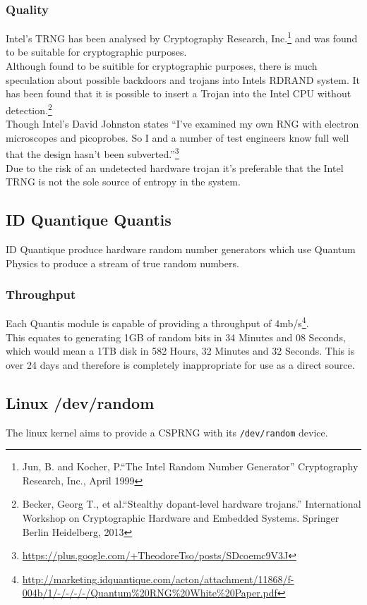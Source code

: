 \documentclass{paper}
\begin{document}
			\subsubsection{Quality}
				Intel's TRNG has been analysed by Cryptography Research, Inc.\footnote{Jun, B. and Kocher, P.``The Intel Random Number Generator'' Cryptography Research, Inc., April 1999} and was found to be suitable for cryptographic purposes.\\
				Although found to be suitible for cryptographic purposes, there is much speculation about possible backdoors and trojans into Intels RDRAND system. It has been found that it is possible to insert a Trojan into the Intel CPU without detection.\footnote{Becker, Georg T., et al.``Stealthy dopant-level hardware trojans.'' International Workshop on Cryptographic Hardware and Embedded Systems. Springer Berlin Heidelberg, 2013}\\
				Though Intel's David Johnston states ``I’ve examined my own RNG with electron microscopes and picoprobes. So I and a number of test engineers know full well that the design hasn’t been subverted.''\footnote{\url{https://plus.google.com/+TheodoreTso/posts/SDcoemc9V3J}}\\
				Due to the risk of an undetected hardware trojan it's preferable that the Intel TRNG is not the sole source of entropy in the system.
				
		\subsection{ID Quantique Quantis}
		ID Quantique produce hardware random number generators which use Quantum Physics to produce a stream of true random numbers.
			\subsubsection{Throughput}
				Each Quantis module is capable of providing a throughput of 4mb/s\footnote{\url{http://marketing.idquantique.com/acton/attachment/11868/f-004b/1/-/-/-/-/Quantum\%20RNG\%20White\%20Paper.pdf}}.\\
				This equates to generating 1GB of random bits in 34 Minutes and 08 Seconds, which would mean a 1TB disk in 582 Hours, 32 Minutes and 32 Seconds. This is over 24 days and therefore is completely inappropriate for use as a direct source.\\
			
		\subsection{Linux /dev/random}
		The linux kernel aims to provide a CSPRNG with its \texttt{/dev/random} device.
\end{document}
